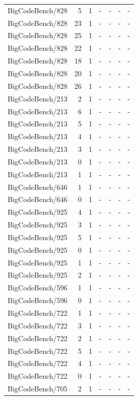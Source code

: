 \begin{longtable}{lrrllll}
BigCodeBench/828 & 5 & 1 & - & - & - & - \\
BigCodeBench/828 & 23 & 1 & - & - & - & - \\
BigCodeBench/828 & 25 & 1 & - & - & - & - \\
BigCodeBench/828 & 22 & 1 & - & - & - & - \\
BigCodeBench/828 & 18 & 1 & - & - & - & - \\
BigCodeBench/828 & 20 & 1 & - & - & - & - \\
BigCodeBench/828 & 26 & 1 & - & - & - & - \\
BigCodeBench/213 & 2 & 1 & - & - & - & - \\
BigCodeBench/213 & 6 & 1 & - & - & - & - \\
BigCodeBench/213 & 5 & 1 & - & - & - & - \\
BigCodeBench/213 & 4 & 1 & - & - & - & - \\
BigCodeBench/213 & 3 & 1 & - & - & - & - \\
BigCodeBench/213 & 0 & 1 & - & - & - & - \\
BigCodeBench/213 & 1 & 1 & - & - & - & - \\
BigCodeBench/646 & 1 & 1 & - & - & - & - \\
BigCodeBench/646 & 0 & 1 & - & - & - & - \\
BigCodeBench/925 & 4 & 1 & - & - & - & - \\
BigCodeBench/925 & 3 & 1 & - & - & - & - \\
BigCodeBench/925 & 5 & 1 & - & - & - & - \\
BigCodeBench/925 & 0 & 1 & - & - & - & - \\
BigCodeBench/925 & 1 & 1 & - & - & - & - \\
BigCodeBench/925 & 2 & 1 & - & - & - & - \\
BigCodeBench/596 & 1 & 1 & - & - & - & - \\
BigCodeBench/596 & 0 & 1 & - & - & - & - \\
BigCodeBench/722 & 1 & 1 & - & - & - & - \\
BigCodeBench/722 & 3 & 1 & - & - & - & - \\
BigCodeBench/722 & 2 & 1 & - & - & - & - \\
BigCodeBench/722 & 5 & 1 & - & - & - & - \\
BigCodeBench/722 & 4 & 1 & - & - & - & - \\
BigCodeBench/722 & 0 & 1 & - & - & - & - \\
BigCodeBench/705 & 2 & 1 & - & - & - & - \\

\end{longtable}
